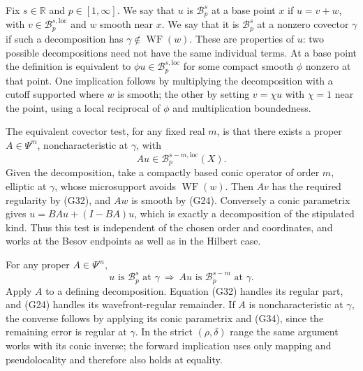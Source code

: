 \documentclass[
  11pt,
]{article}
\begin{document}
Fix \(s\in\mathbb R\) and \(p\in[1,\infty]\). We say that \(u\) is
\(\mathcal B^s_p\) at a base point \(x\) if \(u=v+w\), with
\(v\in\mathcal B^{s,\mathrm{loc}}_p\) and \(w\) smooth near \(x\). We
say that it is \(\mathcal B^s_p\) at a nonzero covector \(\gamma\) if
such a decomposition has \(\gamma\notin\operatorname{WF}(w)\). These are
properties of \(u\): two possible decompositions need not have the same
individual terms. At a base point the definition is equivalent to
\(\phi u\in\mathcal B^{s,\mathrm{loc}}_p\) for some compact smooth
\(\phi\) nonzero at that point. One implication follows by multiplying
the decomposition with a cutoff supported where \(w\) is smooth; the
other by setting \(v=\chi u\) with \(\chi=1\) near the point, using a
local reciprocal of \(\phi\) and multiplication boundedness.

The equivalent covector test, for any fixed real \(m\), is that there
exists a proper \(A\in\Psi^m\), noncharacteristic at \(\gamma\), with \[
Au\in\mathcal B^{s-m,\mathrm{loc}}_p(X).
\tag{G33}
\] Given the decomposition, take a compactly based conic operator of
order \(m\), elliptic at \(\gamma\), whose microsupport avoids
\(\operatorname{WF}(w)\). Then \(Av\) has the required regularity by
(G32), and \(Aw\) is smooth by (G24). Conversely a conic parametrix
gives \(u=BAu+(I-BA)u\), which is exactly a decomposition of the
stipulated kind. Thus this test is independent of the chosen order and
coordinates, and works at the Besov endpoints as well as in the Hilbert
case.

For any proper \(A\in\Psi^m\), \[
u\text{ is }\mathcal B^s_p\text{ at }\gamma
\ \Longrightarrow\ Au\text{ is }\mathcal B^{s-m}_p\text{ at }\gamma.
\tag{G34}
\] Apply \(A\) to a defining decomposition. Equation (G32) handles its
regular part, and (G24) handles its wavefront-regular remainder. If
\(A\) is noncharacteristic at \(\gamma\), the converse follows by
applying its conic parametrix and (G34), since the remaining error is
regular at \(\gamma\). In the strict \((\rho,\delta)\) range the same
argument works with its conic inverse; the forward implication uses only
mapping and pseudolocality and therefore also holds at equality.
\end{document}
